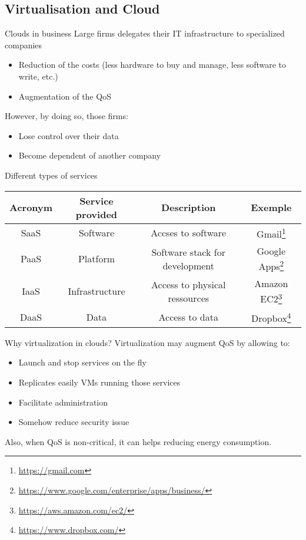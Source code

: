 \documentclass{beamer}
\begin{document}
\subsection{Virtualisation and Cloud}
\begin{frame}{Clouds in business}
Large firms delegates their IT infrastructure to specialized companies
\begin{itemize}
	\item Reduction of the costs (less hardware to buy and manage,
		less software to write, etc.)
	\item Augmentation of the QoS
\end{itemize}
However, by doing so, those firms:
\begin{itemize}
	\item Lose control over their data
	\item Become dependent of another company
\end{itemize}
\end{frame}
\begin{frame}{Different types of services}
\begin{scriptsize}
\begin{tabular}{c|c|c|c}
	\textbf{Acronym} & \textbf{Service} \textbf{provided} & \textbf{Description} & \textbf{Exemple} \\
	\hline
	\hline
	SaaS & Software & Accses to software &
		Gmail\footnote{\url{https://gmail.com}} \\
	\hline
	PaaS & Platform & Software stack for development &
		Google Apps\footnote{\url{https://www.google.com/enterprise/apps/business/}} \\
	\hline
	IaaS & Infrastructure & Access to physical ressources &
		Amazon EC2\footnote{\url{https://aws.amazon.com/ec2/}} \\
	\hline
	DaaS & Data & Access to data&
		Dropbox\footnote{\url{https://www.dropbox.com/}}
\end{tabular}
\end{scriptsize}
\end{frame}
\begin{frame}{Why virtualization in clouds?}
Virtualization may augment QoS by allowing to:
\begin{itemize}
	\item Launch and stop services on the fly
	\item Replicates easily VMs running those services
	\item Facilitate administration
	\item Somehow reduce security issue
\end{itemize}
Also, when QoS is non-critical, it can helps reducing energy
consumption.
\end{frame}
\end{document}

